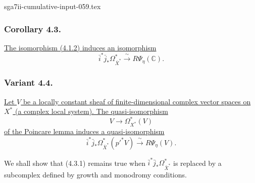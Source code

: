\begin{filecontents*}{sga7ii-cumulative-input-059.tex}
\subsubsection*{Corollary 4.3.}
\underline{The isomorphism (4.1.2) induces an isomorphism}
\begin{equation}\tag{4.3.1}
\bar i^*\bar j_*\Omega_{\bar X^*}^*
\xrightarrow{\ \sim\ }R\Psi_\eta(\mathbb C).
\end{equation}

\subsubsection*{Variant 4.4.}
\underline{Let $V$ be a locally constant sheaf of finite-dimensional
complex vector spaces on $X^*$ (a complex local system).  The
quasi-isomorphism}
\[
V\longrightarrow\Omega_{X^*}^*(V)
\]
\underline{of the Poincare lemma induces a quasi-isomorphism}
\begin{equation}\tag{4.4.1}
\bar i^*\bar j_*\Omega_{\bar X^*}^*(p'^*V)
\xrightarrow{\ \sim\ }R\Psi_\eta(V).
\end{equation}

We shall show that (4.3.1) remains true when
$\bar i^*\bar j_*\Omega_{\bar X^*}^*$ is replaced by a subcomplex
defined by growth and monodromy conditions.
\end{filecontents*}
